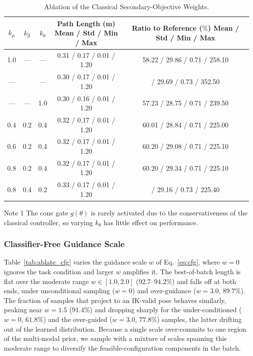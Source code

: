 \documentclass[journal, twoside]{IEEEtran}
\newcommand{\limebox}[1]{\setlength{\fboxsep}{0pt}{\colorbox{lime}{#1}}}
\newcommand{\pinkbox}[1]{\setlength{\fboxsep}{0pt}{\colorbox{yellow}{#1}}}
\begin{document}
\begin{table}[!htbp]
\centering
\caption{Ablation of the Classical Secondary-Objective Weights.}
\label{tab:ablate_classical}
\begin{threeparttable}
\begin{tabular}{ccccc}
\toprule
$k_{\mu}$ & $k_{\mathrm{jl}}$ & $k_{\theta}$
& \shortstack{Path Length (m)\\ {\scriptsize Mean / Std / Min / Max}}
& \shortstack{Ratio to Reference ($\%$)\\ {\scriptsize Mean / Std / Min / Max}} \\
\midrule
1.0 & ---        & ---        & 0.31 / 0.17 / 0.01 / 1.20 & 58.22 / 29.86 / 0.71 / 258.10 \\
---        & \pinkbox{1.0} & ---        & 0.30 / 0.17 / 0.01 / 1.20 & \pinkbox{56.82} / 29.69 / 0.73 / 352.50 \\
---        & ---        & 1.0 & 0.30 / 0.16 / 0.01 / 1.20 & 57.23 / 28.75 / 0.71 / 239.50 \\
\midrule
0.4 & 0.2 & 0.4 & 0.32 / 0.17 / 0.01 / 1.20 & 60.01 / 28.84 / 0.71 / 225.00 \\
0.6 & 0.2 & 0.4 & 0.32 / 0.17 / 0.01 / 1.20 & 60.20 / 29.08 / 0.71 / 225.10 \\
0.8 & 0.2 & 0.4 & 0.32 / 0.17 / 0.01 / 1.20 & 60.20 / 29.34 / 0.71 / 225.10 \\
0.8 & 0.4 & 0.2 & 0.33 / 0.17 / 0.01 / 1.20 & \limebox{60.74} / 29.16 / 0.73 / 225.40 \\
\bottomrule
\end{tabular}
\begin{tablenotes}
    \item[Note 1] The cone gate $g(\theta)$ is rarely activated due to the conservativeness of the classical controller, so varying $k_{\theta}$ has little effect on performance.
\end{tablenotes}
\end{threeparttable}
\end{table}

\subsubsection{Classifier-Free Guidance Scale}

Table~\ref{tab:ablate_cfg} varies the guidance scale $w$ of Eq.~\eqref{eq:cfg}, where $w=0$ ignores the task condition and larger $w$ amplifies it. The best-of-batch length is flat over the moderate range $w\in[1.0,2.0]$ ($92.7$--$94.2\%$) and falls off at both ends, under unconditional sampling ($w=0$) and over-guidance ($w=3.0$, $89.7\%$). The fraction of samples that project to an IK-valid pose behaves similarly, peaking near $w=1.5$ ($91.4\%$) and dropping sharply for the under-conditioned ($w=0$, $61.8\%$) and the over-guided ($w=3.0$, $77.8\%$) samples, the latter drifting out of the learned distribution. Because a single scale over-commits to one region of the multi-modal prior, we sample with a mixture of scales spanning this moderate range to diversify the feasible-configuration components in the batch.
\end{document}
